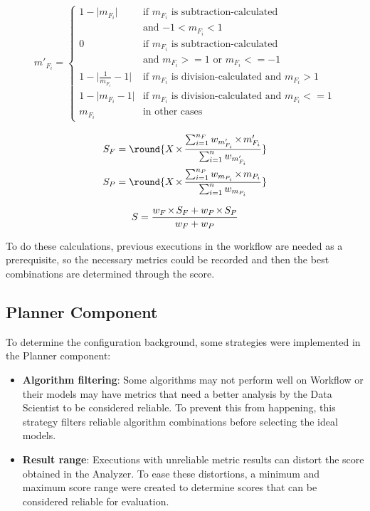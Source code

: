 \documentclass[sigconf]{acmart}
\DeclarePairedDelimiter{\round}\lfloor\rceil
\let\oldtimes\times
\def\times{{\mkern1mu\oldtimes\mkern1mu}}
\begin{document}
\begin{gather}
\label{eqn:normalizationFairness}
	m'_{F_i} = 
	\begin{cases}
	1-\lvert m_{F_i} \rvert & \text{if $m_{F_i}$ is subtraction-calculated}\\
	& \text{and $-1 < m_{F_i} < 1$}\\
	0 & \text{if $m_{F_i}$ is subtraction-calculated}\\
	& \text{and $m_{F_i} >= 1$ or $m_{F_i} <= -1$}\\
	1-\lvert \frac{1}{m_{F_i}}-1 \lvert & \text{if $m_{F_i}$ is division-calculated and $m_{F_i} > 1$}\\
	1-\lvert m_{F_i}-1 \lvert & \text{if $m_{F_i}$ is division-calculated and $m_{F_i} <= 1$}\\
	m_{F_i} & \text{in other cases}
	\end{cases}
\end{gather}

\begin{equation}
\label{eqn:groupScores}
	\begin{aligned}
	S_F = \round{X \times \frac{\sum_{i=1}^{n_F} w_{m'_{F_i}} \times m'_{F_i}}{\sum_{i=1}^{n} w_{m'_{F_i}}}}\\
	S_P = \round{X \times \frac{\sum_{i=1}^{n_P} w_{m_{P_i}} \times m_{P_i}}{\sum_{i=1}^{n} w_{m_{P_i}}}}
	\end{aligned}
\end{equation}

\begin{equation}
\label{eqn:totalScore}
	S = \frac{w_F \times S_F + w_P \times S_P}{w_F + w_P}
\end{equation}

To do these calculations, previous executions in the workflow are needed as a prerequisite, so the necessary metrics could be recorded and then the best combinations are determined through the score.

\subsection{Planner Component}

To determine the configuration background, some strategies were implemented in the Planner component:

\begin{itemize}
\item \textbf{Algorithm filtering}: Some algorithms may not perform well on Workflow or their models may have metrics that need a better analysis by the Data Scientist to be considered reliable. To prevent this from happening, this strategy filters reliable algorithm combinations before selecting the ideal models.
\item \textbf{Result range}: Executions with unreliable metric results can distort the score obtained in the Analyzer. To ease these distortions, a minimum and maximum score range were created to determine scores that can be considered reliable for evaluation.
\end{itemize}
\end{document}
